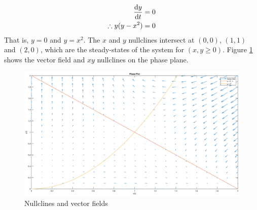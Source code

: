 \documentclass[11pt,1in]{article}
\newenvironment{Example}[2][Example]{\begin{trivlist}
		\item[\hskip \labelsep {\bfseries #1}\hskip \labelsep {\bfseries #2.}]}{\end{trivlist}}
\begin{document}
\begin{Example}{2}
\begin{align*}
	\derivative{y}{t} &= 0\\
	\therefore y(y - x^2 ) &= 0
	\end{align*}
	That is, $y = 0$ and $y = x^2$. The $x$ and $y$ nullclines intersect at $(0,0)$, $(1,1)$ and $(2,0)$, which are the steady-states of the system for $(x,y \ge 0)$. Figure \ref{fig:example2} shows the vector field and $xy$ nullclines on the phase plane. 
\begin{figure}[H]
	\centering
	\includegraphics[trim={2in 0 2in 0},width=\linewidth]{Figures/example_2}
	\caption{Nullclines and vector fields}
	\label{fig:example2}
\end{figure}
\end{Example}
\end{document}
